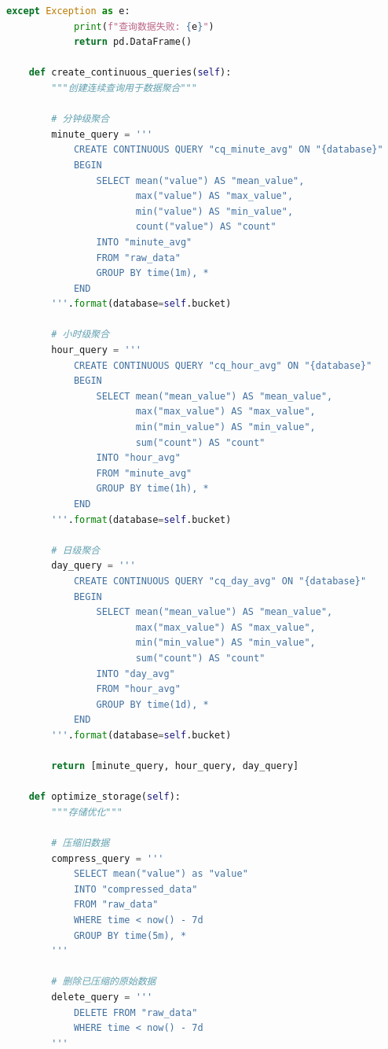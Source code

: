 \begin{lstlisting}[language=Python]
        except Exception as e:
            print(f"查询数据失败: {e}")
            return pd.DataFrame()
    
    def create_continuous_queries(self):
        """创建连续查询用于数据聚合"""
        
        # 分钟级聚合
        minute_query = '''
            CREATE CONTINUOUS QUERY "cq_minute_avg" ON "{database}"
            BEGIN
                SELECT mean("value") AS "mean_value",
                       max("value") AS "max_value",
                       min("value") AS "min_value",
                       count("value") AS "count"
                INTO "minute_avg"
                FROM "raw_data"
                GROUP BY time(1m), *
            END
        '''.format(database=self.bucket)
        
        # 小时级聚合
        hour_query = '''
            CREATE CONTINUOUS QUERY "cq_hour_avg" ON "{database}"
            BEGIN
                SELECT mean("mean_value") AS "mean_value",
                       max("max_value") AS "max_value",
                       min("min_value") AS "min_value",
                       sum("count") AS "count"
                INTO "hour_avg"
                FROM "minute_avg"
                GROUP BY time(1h), *
            END
        '''.format(database=self.bucket)
        
        # 日级聚合
        day_query = '''
            CREATE CONTINUOUS QUERY "cq_day_avg" ON "{database}"
            BEGIN
                SELECT mean("mean_value") AS "mean_value",
                       max("max_value") AS "max_value",
                       min("min_value") AS "min_value",
                       sum("count") AS "count"
                INTO "day_avg"
                FROM "hour_avg"
                GROUP BY time(1d), *
            END
        '''.format(database=self.bucket)
        
        return [minute_query, hour_query, day_query]
    
    def optimize_storage(self):
        """存储优化"""
        
        # 压缩旧数据
        compress_query = '''
            SELECT mean("value") as "value"
            INTO "compressed_data"
            FROM "raw_data"
            WHERE time < now() - 7d
            GROUP BY time(5m), *
        '''
        
        # 删除已压缩的原始数据
        delete_query = '''
            DELETE FROM "raw_data"
            WHERE time < now() - 7d
        '''
        

\end{lstlisting}
